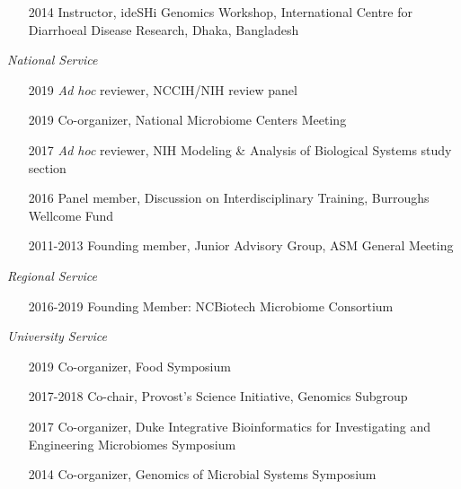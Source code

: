 \documentclass[overlapped,line,11pt]{res}
\begin{document}
\begin{resume}
\begin{itemize}[leftmargin=2cm, style=sameline, itemsep=0mm]
\item[2014] Instructor, ideSHi Genomics Workshop, International Centre for Diarrhoeal Disease Research, Dhaka, Bangladesh
\end{itemize}

\emph{National Service}
\vspace{.15in}

\begin{itemize}[leftmargin=2cm, style=sameline, itemsep=0mm]
\item[2019] \emph{Ad hoc} reviewer, NCCIH/NIH review panel
\item[2019] Co-organizer, National Microbiome Centers Meeting
\item[2017] \emph{Ad hoc} reviewer, NIH Modeling \& Analysis of
  Biological Systems study section
\item[2016] Panel member, Discussion on Interdisciplinary Training,
  Burroughs Wellcome Fund
\item[2011-2013] Founding member, Junior Advisory Group, ASM General
  Meeting

\end{itemize}

\emph{Regional Service}
\vspace{.15in}


\begin{itemize}[leftmargin=2cm, style=sameline, itemsep=0mm]
\item[2016-2019] Founding Member: NCBiotech Microbiome Consortium
\end{itemize}

\emph{University Service}
\vspace{.15in}


\begin{itemize}[leftmargin=2cm, style=sameline, itemsep=0mm]
\item[2019] Co-organizer, Food Symposium
\item[2017-2018] Co-chair, Provost's Science Initiative, Genomics Subgroup
\item[2017] Co-organizer, Duke Integrative Bioinformatics for
  Investigating and Engineering Microbiomes Symposium
\item[2014] Co-organizer, Genomics of Microbial Systems Symposium
\end{itemize}


\end{resume}
\end{document}
